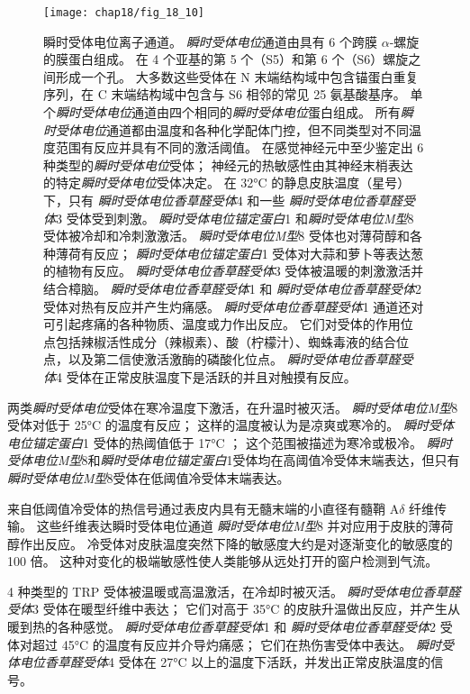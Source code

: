 \begin{figure}[htbp]
	\centering
	\texttt{[image: chap18/fig\_18\_10]}
	\caption{瞬时受体电位离子通道。
		\textit{瞬时受体电位}通道由具有 6 个跨膜 $\alpha$-螺旋的膜蛋白组成。
		在 4 个亚基的第 5 个（S5）和第 6 个（S6）螺旋之间形成一个孔。
		大多数这些受体在 N 末端结构域中包含锚蛋白重复序列，在 C 末端结构域中包含与 S6 相邻的常见 25 氨基酸基序。
		单个\textit{瞬时受体电位}通道由四个相同的\textit{瞬时受体电位}蛋白组成。
		所有\textit{瞬时受体电位}通道都由温度和各种化学配体门控，但不同类型对不同温度范围有反应并具有不同的激活阈值。
		在感觉神经元中至少鉴定出 6 种类型的\textit{瞬时受体电位}受体； 神经元的热敏感性由其神经末梢表达的特定\textit{瞬时受体电位}受体决定。
		在 32°C 的静息皮肤温度（星号）下，只有 \textit{瞬时受体电位香草醛受体}4 和一些 \textit{瞬时受体电位香草醛受体}3 受体受到刺激。
		\textit{瞬时受体电位锚定蛋白}1 和\textit{瞬时受体电位M型}8 受体被冷却和冷刺激激活。
		\textit{瞬时受体电位M型}8 受体也对薄荷醇和各种薄荷有反应；
		\textit{瞬时受体电位锚定蛋白}1 受体对大蒜和萝卜等表达葱的植物有反应。
		\textit{瞬时受体电位香草醛受体}3 受体被温暖的刺激激活并结合樟脑。
		\textit{瞬时受体电位香草醛受体}1 和 \textit{瞬时受体电位香草醛受体}2 受体对热有反应并产生灼痛感。 
		\textit{瞬时受体电位香草醛受体}1 通道还对可引起疼痛的各种物质、温度或力作出反应。
		它们对受体的作用位点包括辣椒活性成分（辣椒素）、酸（柠檬汁）、蜘蛛毒液的结合位点，以及第二信使激活激酶的磷酸化位点。
		\textit{瞬时受体电位香草醛受体}4 受体在正常皮肤温度下是活跃的并且对触摸有反应\cite{jordt2003lessons}。}
	\label{fig:18_10}
\end{figure}


两类\textit{瞬时受体电位}受体在寒冷温度下激活，在升温时被灭活。
\textit{瞬时受体电位M型}8 受体对低于 25°C 的温度有反应； 这样的温度被认为是凉爽或寒冷的。
\textit{瞬时受体电位锚定蛋白}1 受体的热阈值低于 17°C ；
这个范围被描述为寒冷或极冷。
\textit{瞬时受体电位M型}8和\textit{瞬时受体电位锚定蛋白}1受体均在高阈值冷受体末端表达，但只有\textit{瞬时受体电位M型}8受体在低阈值冷受体末端表达。


来自低阈值冷受体的热信号通过表皮内具有无髓末端的小直径有髓鞘 A$\delta$ 纤维传输。
这些纤维表达瞬时受体电位通道 \textit{瞬时受体电位M型}8 并对应用于皮肤的薄荷醇作出反应。
冷受体对皮肤温度突然下降的敏感度大约是对逐渐变化的敏感度的 100 倍。
这种对变化的极端敏感性使人类能够从远处打开的窗户检测到气流。


4 种类型的 TRP 受体被温暖或高温激活，在冷却时被灭活。
\textit{瞬时受体电位香草醛受体}3 受体在暖型纤维中表达； 它们对高于 35°C 的皮肤升温做出反应，并产生从暖到热的各种感觉。
\textit{瞬时受体电位香草醛受体}1 和 \textit{瞬时受体电位香草醛受体}2 受体对超过 45°C 的温度有反应并介导灼痛感；
它们在热伤害受体中表达。 
\textit{瞬时受体电位香草醛受体}4 受体在 27°C 以上的温度下活跃，并发出正常皮肤温度的信号。


